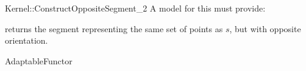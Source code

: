 \begin{ccRefFunctionObjectConcept}{Kernel::ConstructOppositeSegment_2}
A model for this must provide:


{returns the segment representing the same set of points as $s$,
but with opposite orientation.}

\ccRefines
AdaptableFunctor

\ccSeeAlso
{}\\

\end{ccRefFunctionObjectConcept}
